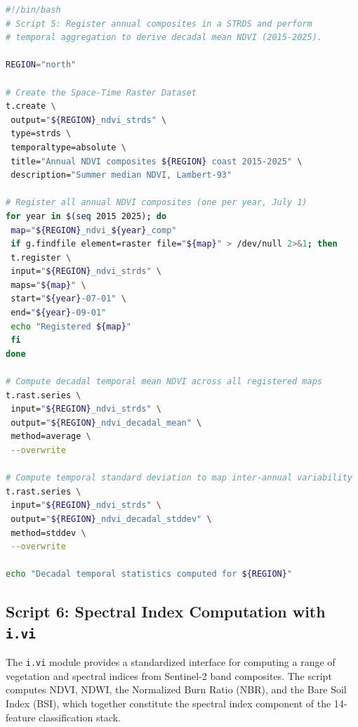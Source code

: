 \documentclass[coasts,article,accept,pdftex,moreauthors]{Definitions/mdpi}
\begin{document}
\begin{lstlisting}[language=bash,caption={Space-Time Raster Dataset creation and temporal aggregation using \texttt{t.rast.series}.}, label={lst:trast},xleftmargin=11pt,xrightmargin=3.5pt]
#!/bin/bash
# Script 5: Register annual composites in a STRDS and perform
# temporal aggregation to derive decadal mean NDVI (2015-2025).

REGION="north"

# Create the Space-Time Raster Dataset
t.create \
 output="${REGION}_ndvi_strds" \
 type=strds \
 temporaltype=absolute \
 title="Annual NDVI composites ${REGION} coast 2015-2025" \
 description="Summer median NDVI, Lambert-93"

# Register all annual NDVI composites (one per year, July 1)
for year in $(seq 2015 2025); do
 map="${REGION}_ndvi_${year}_comp"
 if g.findfile element=raster file="${map}" > /dev/null 2>&1; then
 t.register \
 input="${REGION}_ndvi_strds" \
 maps="${map}" \
 start="${year}-07-01" \
 end="${year}-09-01"
 echo "Registered ${map}"
 fi
done

# Compute decadal temporal mean NDVI across all registered maps
t.rast.series \
 input="${REGION}_ndvi_strds" \
 output="${REGION}_ndvi_decadal_mean" \
 method=average \
 --overwrite

# Compute temporal standard deviation to map inter-annual variability
t.rast.series \
 input="${REGION}_ndvi_strds" \
 output="${REGION}_ndvi_decadal_stddev" \
 method=stddev \
 --overwrite

echo "Decadal temporal statistics computed for ${REGION}"
\end{lstlisting}

\subsection{Script 6: Spectral Index Computation with \texttt{i.vi}}

The \texttt{i.vi} module provides a standardized interface for computing a range of vegetation and spectral indices from Sentinel-2 band composites. The script computes NDVI, NDWI, the Normalized Burn Ratio (NBR), and the Bare Soil Index (BSI), which together constitute the spectral index component of the 14-feature classification stack.
\end{document}
